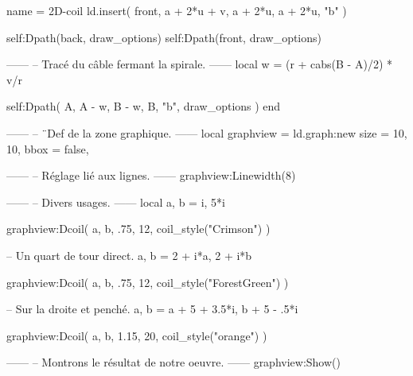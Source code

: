 \documentclass[varwidth]{standalone}
\begin{document}
\begin{luadraw*}{name = 2D-coil}
  ld.insert(
    front,
    {a + 2*u + v, a + 2*u, a + 2*u, "b"}
  )

  self:Dpath(back, draw_options)
  self:Dpath(front, draw_options)

------
-- Tracé du câble fermant la spirale.
------
  local w = (r + cabs(B - A)/2) * v/r

  self:Dpath(
    {A, A - w, B - w, B, "b"},
    draw_options
  )
end

------
-- ¨Def de la zone graphique.
------
local graphview = ld.graph:new{
  size = {10, 10},
  bbox = false,
}

------
-- Réglage lié aux lignes.
------
graphview:Linewidth(8)

------
-- Divers usages.
------
local a, b = i, 5*i

graphview:Dcoil(
  a, b,
  .75,
  12,
  coil_style("Crimson")
)

-- Un quart de tour direct.
a, b = 2 + i*a, 2 + i*b

graphview:Dcoil(
  a, b,
  .75,
  12,
  coil_style("ForestGreen")
)

-- Sur la droite et penché.
a, b = a + 5 + 3.5*i, b + 5 - .5*i

graphview:Dcoil(
  a, b,
  1.15,
  20,
  coil_style("orange")
)

------
-- Montrons le résultat de notre oeuvre.
------
graphview:Show()
\end{luadraw*}
\end{document}
